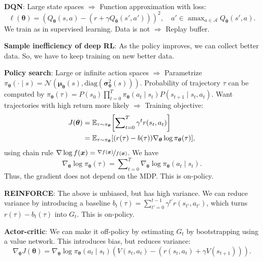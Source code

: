\documentclass{article}
\DeclareMathOperator*{\argmax}{amax}
\newcommand{\lft}{\mathopen{}\mathclose\bgroup\left}
\newcommand{\rgt}{\aftergroup\egroup\right}
\newcommand{\E}{\mathbb{E}}
\renewcommand{\vec}[1]{\bm{#1}}
\newenvironment{topic}[1]
{\textbf{\sffamily \colorbox{black}{\rlap{\textbf{\textcolor{white}{#1}}}\hspace{\linewidth}\hspace{-2\fboxsep}}} \\ \vspace{0.2cm}}
{}
\begin{document}
\begin{multicols*}{2}
\begin{topic}{Reinforcement learning}
        \textbf{DQN}: Large state spaces $\Rightarrow$ Function approximation with loss: \[
            \ell(\vec{\theta}) = (Q_{\vec{\theta}}(s,a) - (r + \gamma Q_{\bar{\vec{\theta}}}(s', a')))^2, \quad a' \in \argmax\nolimits_{a \in \mathcal{A}} Q_{\bar{\vec{\theta}}}(s', a).
        \]
        We train as in supervised learning. Data is not \iid $\Rightarrow$ Replay buffer.

        \textbf{Sample inefficiency of deep RL}: As the policy improves, we can collect better data.
        So, we have to keep training on new better data.

        \textbf{Policy search}: Large or infinite action spaces $\Rightarrow$ Parametrize $\pi_{\vec{\theta}}(\cdot \mid s) = \mathcal{N}(\vec{\mu}_{\vec{\theta}}(s), \mathrm{diag}(\vec{\sigma}_{\vec{\theta}}^2(s)))$.
        Probability of trajectory $\tau$ can be computed by $\pi_{\vec{\theta}}(\tau) = P(s_0) \prod\nolimits_{t=0}^T \pi_{\vec{\theta}}(a_t \mid s_t) P(s_{t+1} \mid s_t, a_t)$.
        Want trajectories with high return more likely $\Rightarrow$ Training objective:
        \begin{align*}
            J(\vec{\theta}) & = \E_{\tau \sim \pi_{\vec{\theta}}} \lft[ \sum\nolimits_{t=0}^{T} \gamma^t r(s_t, a_t) \rgt]                     \\
                            & = \E_{\tau \sim \pi_{\vec{\theta}}} [ (r(\tau) - b(\tau)) \nabla_{\vec{\theta}} \log \pi_{\vec{\theta}}(\tau) ],
        \end{align*}
        using chain rule $\nabla \log f(\vec{x}) = \nicefrac{\nabla f(\vec{x})}{f(\vec{x})}$. We have \[
            \nabla_{\vec{\theta}} \log \pi_{\vec{\theta}}(\tau) = \sum\nolimits_{t=0}^{T} \nabla_{\vec{\theta}} \log \pi_{\vec{\theta}}(a_t \mid s_t).
        \]
        Thus, the gradient does not depend on the MDP. This is on-policy.

        \textbf{REINFORCE}: The above is unbiased, but has high variance. We can reduce variance by
        introducing a baseline $b_t(\tau) = \sum_{t'=0}^{t-1} \gamma^{t'} r(s_{t'}, a_{t'})$, which
        turns $r(\tau) - b_t(\tau)$ into $G_t$. This is on-policy.

        \textbf{Actor-critic}: We can make it off-policy by estimating $G_t$ by bootstrapping using a value network. This introduces bias, but reduces variance: \[
            \nabla_{\vec{\theta}} J(\vec{\theta}) = \nabla_{\vec{\theta}} \log \pi_{\vec{\theta}} (a_t \mid s_t) (V(s_t, a_t) - (r(s_t, a_t) + \gamma V(s_{t+1}))).
        \]


\end{topic}
\end{multicols*}
\end{document}
